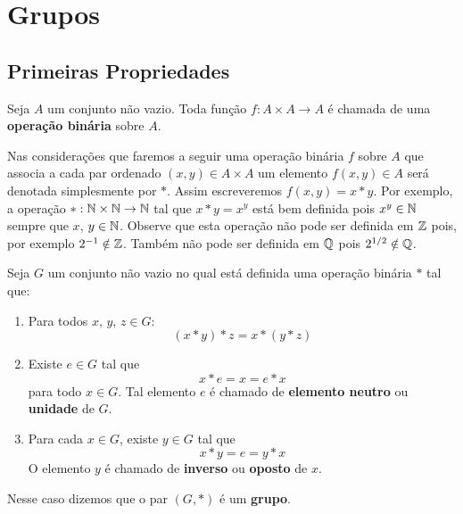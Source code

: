 \chapter{Grupos}

\section{Primeiras Propriedades} %
\label{sec:primeiras_propriedades}

\begin{definicao}
   Seja $A$ um conjunto n\~ao vazio. Toda fun\c{c}\~ao $f : A \times A \to A$ \'e chamada de uma \textbf{opera\c{c}\~ao bin\'aria} sobre $A$.
\end{definicao}

Nas considera\c{c}\~oes que faremos a seguir uma opera\c{c}\~ao bin\'aria $f$ sobre $A$ que associa a cada par ordenado $(x, y) \in A \times A$ um elemento $f(x, y) \in A$ ser\'a denotada simplesmente por $*$. Assim escreveremos $f(x, y) = x*y$. Por exemplo, a opera\c{c}\~ao $* : \mathbb{N} \times \mathbb{N} \to \mathbb{N}$ tal que $x*y = x^y$ est\'a bem definida pois $x^y \in \mathbb{N}$ sempre que $x$, $y \in \mathbb{N}$. Observe que esta opera\c{c}\~ao n\~ao pode ser definida em $\mathbb{Z}$ pois, por exemplo $2^{-1} \notin \mathbb{Z}$. Tamb\'em n\~ao pode ser definida em $\mathbb{Q}$ pois $2^{1/2} \notin \mathbb{Q}$.

\begin{definicao}
    Seja $G$ um conjunto n{\~a}o vazio no qual est\'a definida uma opera{\c c}{\~a}o bin{\'a}ria $*$ tal que:
    \begin{enumerate}[label={\roman*})]
        \item Para todos $x$, $y$, $z\in G$:
        \[
            (x*y)*z=x*(y*z)
        \]

        \item Existe $e \in G$ tal que
        \[
            x*e = x = e*x
        \]
        para todo $x \in G$. Tal elemento $e$ {\'e} chamado de \textbf{elemento neutro} ou \textbf{unidade} de $G$.

        \item Para cada $x \in G$, existe $y \in G$ tal que
        \[
            x*y = e = y*x
        \]
        O elemento $y$ {\'e} chamado de \textbf{inverso} ou \textbf{oposto} de $x$.
    \end{enumerate}
    Nesse caso dizemos que o par $(G, *)$ \'e um \textbf{grupo}.
\end{definicao}

